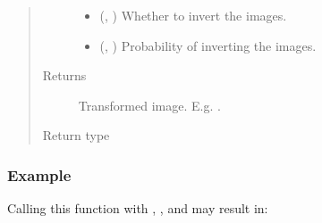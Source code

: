 \documentclass[letterpaper,10pt,english]{sphinxmanual}
\begin{document}
\begin{fulllineitems}
\begin{quote}
\begin{description}
\begin{itemize}
\item {} 
 (, ) \textendash{} Whether to invert the images.

\item {} 
 (, ) \textendash{} Probability of inverting the images.

\end{itemize}

\item[{Returns}] \leavevmode
{} \textendash{} Transformed image. E.g. .

\item[{Return type}] \leavevmode
{}

\end{description}\end{quote}
\subsubsection*{Example}

Calling this function with , ,  and 
may result in:



\end{fulllineitems}
\end{document}
